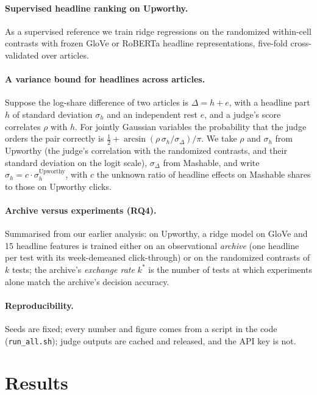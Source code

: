 \documentclass[10pt,a4paper,twocolumn]{article}
\begin{document}
\paragraph{Supervised headline ranking on Upworthy.} As a supervised reference we train ridge regressions on the
randomized within-cell contrasts with frozen GloVe \citep{pennington2014} or RoBERTa \citep{liu2019roberta}
headline representations, five-fold cross-validated over articles.

\paragraph{A variance bound for headlines across articles.} Suppose the log-share difference of two articles is
$\Delta = h + e$, with a headline part $h$ of standard deviation $\sigma_h$ and an independent rest $e$, and a
judge's score correlates $\rho$ with $h$. For jointly Gaussian variables the probability that the judge orders the
pair correctly is $\tfrac12 + \arcsin(\rho\,\sigma_h/\sigma_\Delta)/\pi$. We take $\rho$ and $\sigma_h$ from
Upworthy (the judge's correlation with the randomized contrasts, and their standard deviation on the logit scale),
$\sigma_\Delta$ from Mashable, and write $\sigma_h = c\cdot\sigma_h^{\text{Upworthy}}$, with $c$ the unknown ratio of
headline effects on Mashable shares to those on Upworthy clicks.

\paragraph{Archive versus experiments (RQ4).} Summarised from our earlier analysis: on Upworthy, a ridge model on
GloVe and 15 headline features is trained either on an observational \emph{archive} (one headline per test with its
week-demeaned click-through) or on the randomized contrasts of $k$ tests; the archive's \emph{exchange rate} $k^*$ is
the number of tests at which experiments alone match the archive's decision accuracy.

\paragraph{Reproducibility.} Seeds are fixed; every number and figure comes from a script in the code
(\texttt{run\_all.sh}); judge outputs are cached and released, and the API key is not.

\section{Results}
\label{sec:results}
\end{document}
